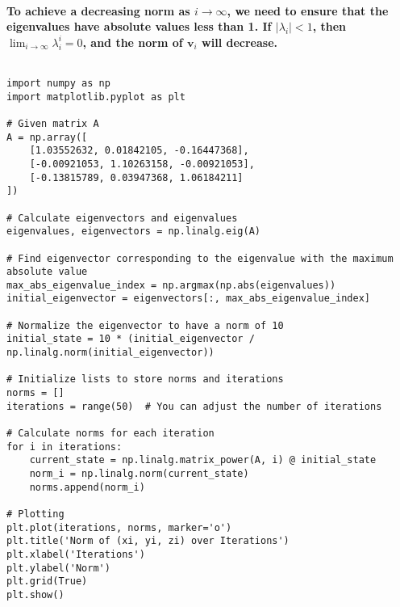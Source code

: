 \paragraph{To achieve a decreasing norm as \(i \rightarrow \infty\), we need to ensure that the eigenvalues have absolute values less than 1. If \(|\lambda_i| < 1\), then \(\lim_{i \to \infty} \lambda_i^i = 0\), and the norm of \(\mathbf{v}_i\) will decrease.}
% 
% 
% 
%
$$$$
% 
% 
% 
% 
\begin{lstlisting}[style=pystyle]
import numpy as np
import matplotlib.pyplot as plt

# Given matrix A
A = np.array([
    [1.03552632, 0.01842105, -0.16447368],
    [-0.00921053, 1.10263158, -0.00921053],
    [-0.13815789, 0.03947368, 1.06184211]
])

# Calculate eigenvectors and eigenvalues
eigenvalues, eigenvectors = np.linalg.eig(A)

# Find eigenvector corresponding to the eigenvalue with the maximum absolute value
max_abs_eigenvalue_index = np.argmax(np.abs(eigenvalues))
initial_eigenvector = eigenvectors[:, max_abs_eigenvalue_index]

# Normalize the eigenvector to have a norm of 10
initial_state = 10 * (initial_eigenvector / np.linalg.norm(initial_eigenvector))

# Initialize lists to store norms and iterations
norms = []
iterations = range(50)  # You can adjust the number of iterations

# Calculate norms for each iteration
for i in iterations:
    current_state = np.linalg.matrix_power(A, i) @ initial_state
    norm_i = np.linalg.norm(current_state)
    norms.append(norm_i)

# Plotting
plt.plot(iterations, norms, marker='o')
plt.title('Norm of (xi, yi, zi) over Iterations')
plt.xlabel('Iterations')
plt.ylabel('Norm')
plt.grid(True)
plt.show()
    
\end{lstlisting}